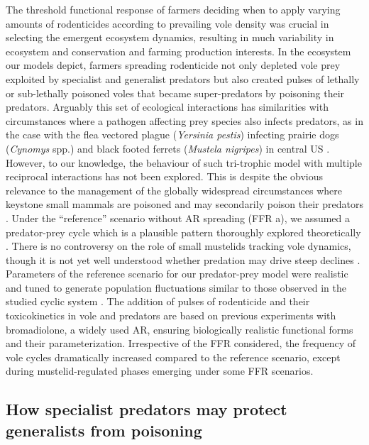 \documentclass[11pt]{article}
\begin{document}
The threshold functional response of farmers deciding when to apply varying amounts of rodenticides according to prevailing vole density was crucial in selecting the emergent ecosystem dynamics, resulting in much variability in ecosystem and conservation and farming production interests. In the ecosystem our models depict, farmers spreading rodenticide not only depleted vole prey exploited by specialist and generalist predators but also created pulses of lethally or sub-lethally poisoned voles that became super-predators by poisoning their predators.  Arguably this set of ecological interactions has similarities with circumstances where a pathogen affecting prey species also infects predators, as in the case with the flea vectored plague (\textit{Yersinia pestis}) infecting prairie dogs (\textit{Cynomys} spp.) and black footed ferrets (\textit{Mustela nigripes}) in central US \citep{Matchett2010}. However, to our knowledge, the behaviour of such tri-trophic model with multiple reciprocal interactions has not been explored. This is despite the obvious relevance to the management of the globally widespread circumstances where keystone small mammals are poisoned and may secondarily poison their predators \citep{Delibes-Mateos2011}.  
Under the “reference” scenario without AR spreading (FFR a), we assumed a predator-prey cycle which is a plausible pattern thoroughly explored theoretically \citep{Hanski2001}. There is no controversy on the role of small mustelids tracking vole dynamics, though it is not yet well understood whether predation may drive steep declines \citep{King2006}. Parameters of the reference scenario for our predator-prey model were realistic and tuned to generate population fluctuations similar to those observed in the studied cyclic system \citep{Delattre2009}.  The addition of pulses of rodenticide and their toxicokinetics in vole and predators are based on previous experiments with bromadiolone, a widely used AR, ensuring biologically realistic functional forms and their parameterization. Irrespective of the FFR considered, the frequency of vole cycles dramatically increased compared to the reference scenario, except during mustelid-regulated phases emerging under some FFR scenarios.

\subsection{How specialist predators may protect generalists from poisoning}
\end{document}
